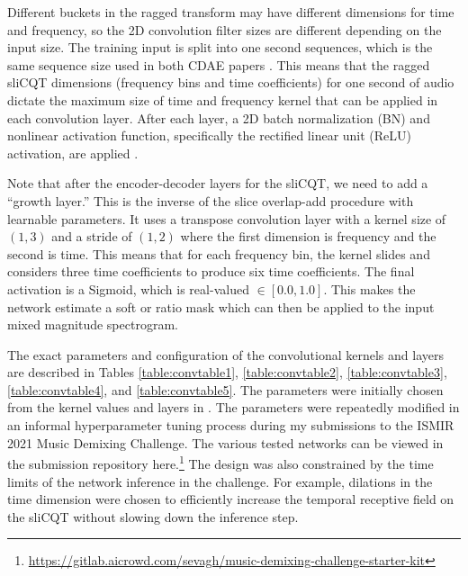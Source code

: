 \documentclass[report.tex]{subfiles}
\begin{document}
Different buckets in the ragged transform may have different dimensions for time and frequency, so the 2D convolution filter sizes are different depending on the input size. The training input is split into one second sequences, which is the same sequence size used in both CDAE papers \parencite{plumbley1, plumbley2}. This means that the ragged sliCQT dimensions (frequency bins and time coefficients) for one second of audio dictate the maximum size of time and frequency kernel that can be applied in each convolution layer. After each layer, a 2D batch normalization (BN) and nonlinear activation function, specifically the rectified linear unit (ReLU) activation, are applied \parencite{plumbley2}.

Note that after the encoder-decoder layers for the sliCQT, we need to add a ``growth layer.'' This is the inverse of the slice overlap-add procedure with learnable parameters. It uses a transpose convolution layer with a kernel size of $(1, 3)$ and a stride of $(1, 2)$ where the first dimension is frequency and the second is time. This means that for each frequency bin, the kernel slides and considers three time coefficients to produce six time coefficients. The final activation is a Sigmoid, which is real-valued $\in [0.0, 1.0]$. This makes the network estimate a soft or ratio mask which can then be applied to the input mixed magnitude spectrogram.

The exact parameters and configuration of the convolutional kernels and layers are described in Tables \ref{table:convtable1}, \ref{table:convtable2}, \ref{table:convtable3}, \ref{table:convtable4}, and \ref{table:convtable5}. The parameters were initially chosen from the kernel values and layers in \textcite{plumbley1, plumbley2}. The parameters were repeatedly modified in an informal hyperparameter tuning process during my submissions to the ISMIR 2021 Music Demixing Challenge. The various tested networks can be viewed in the submission repository here.\footnote{\url{https://gitlab.aicrowd.com/sevagh/music-demixing-challenge-starter-kit}} The design was also constrained by the time limits of the network inference in the challenge. For example, dilations in the time dimension were chosen to efficiently increase the temporal receptive field on the sliCQT without slowing down the inference step.
\end{document}
